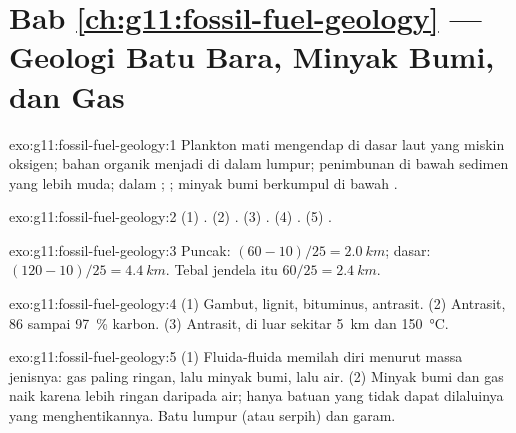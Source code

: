 \section*{Bab \ref{ch:g11:fossil-fuel-geology} --- Geologi Batu Bara, Minyak Bumi, dan Gas}

\begin{solution}{exo:g11:fossil-fuel-geology:1}
Plankton mati mengendap di dasar laut yang miskin oksigen; bahan organik
menjadi  di dalam lumpur; penimbunan di bawah sedimen yang lebih muda;
 dalam ; ; minyak bumi berkumpul di bawah .
\end{solution}

\begin{solution}{exo:g11:fossil-fuel-geology:2}
(1) . (2) . (3) . (4) . (5) .
\end{solution}

\begin{solution}{exo:g11:fossil-fuel-geology:3}
Puncak: $(60 - 10)/25 = \qty{2.0}{km}$; dasar: $(120 - 10)/25 = \qty{4.4}{km}$.
Tebal jendela itu $60/25 = \qty{2.4}{km}$.
\end{solution}

\begin{solution}{exo:g11:fossil-fuel-geology:4}
(1) Gambut, lignit,  bituminus, antrasit. (2) Antrasit, 86 sampai
\qty{97}{\percent} karbon. (3) Antrasit, di luar sekitar \qty{5}{km} dan
\qty{150}{\degreeCelsius}.
\end{solution}

\begin{solution}{exo:g11:fossil-fuel-geology:5}
(1) Fluida-fluida memilah diri menurut massa jenisnya: gas paling ringan, lalu
minyak bumi, lalu air. (2) Minyak bumi dan gas naik karena lebih ringan daripada
air; hanya batuan yang tidak dapat dilaluinya yang menghentikannya. Batu lumpur
(atau serpih) dan garam.
\end{solution}

